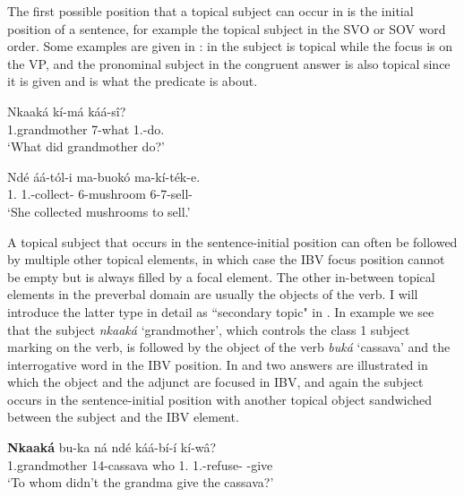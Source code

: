 \documentclass[output=paper,colorlinks,citecolor=brown,
]{langscibook}
\begin{document}
The first possible position that a topical subject can occur in is the initial position of a sentence, for example the topical subject in the SVO or SOV word order. Some examples are given in : in  the subject is topical while the focus is on the VP, and the pronominal subject in the congruent answer  is also topical since it is given and is what the predicate is about.
\begin{exe}
    \ex \label{88}
    \begin{xlist}
\ex
\label{88a}
\gll
Nkaaká kí-má káá-s\^{i}?\\
1.grandmother 7-what 1\Sm{}.\Pst{}-do.\Pst{}\\
\trans ‘What did grandmother do?’

\ex
\label{88b}
\gll
Ndé áá-tól-i ma-buokó ma-kí-ték-e.\\
1.\Pro{} 1\Sm{}.\Pst{}-collect-\Pst{} 6-mushroom 6\Rel{}-7\Sm{}-sell-\Fv{}\\
\trans ‘She collected mushrooms to sell.’

    \end{xlist}
\end{exe}
A topical subject that occurs in the sentence-initial position can often be followed by multiple other topical elements, in which case the IBV focus position cannot be empty but is always filled by a focal element. The other in-between topical elements in the preverbal domain are usually the objects of the verb. I will introduce the latter type in detail as ``secondary topic" in . In example  we see that the subject \textit{nkaaká} `grandmother', which controls the class 1 subject marking on the verb, is followed by the object of the verb \textit{buká} `cassava' and the interrogative word in the IBV position. In  and  two answers are illustrated in which the object and the adjunct are focused in IBV, and again the subject occurs in the sentence-initial position with another topical object sandwiched between the subject and the IBV element.
\begin{exe}
\ex
\label{89}
\gll
\textbf{Nkaaká} bu-ka ná ndé káá-bí-í kí-wâ?\\
1.grandmother 14-cassava who 1.\Pro{} 1\Sm{}.\Pst{}-refuse-\Pst{} \Inf{}-give\\
\trans ‘To whom didn't the grandma give the cassava?’

\end{exe}
\end{document}
